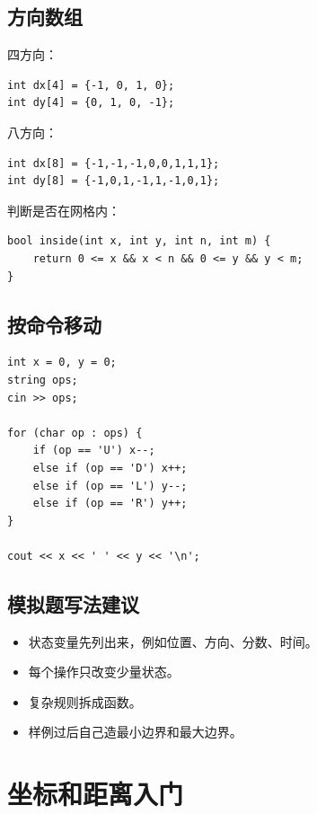 \subsection{方向数组}

四方向：

\begin{lstlisting}
int dx[4] = {-1, 0, 1, 0};
int dy[4] = {0, 1, 0, -1};
\end{lstlisting}

八方向：

\begin{lstlisting}
int dx[8] = {-1,-1,-1,0,0,1,1,1};
int dy[8] = {-1,0,1,-1,1,-1,0,1};
\end{lstlisting}

判断是否在网格内：

\begin{lstlisting}
bool inside(int x, int y, int n, int m) {
    return 0 <= x && x < n && 0 <= y && y < m;
}
\end{lstlisting}

\subsection{按命令移动}

\begin{lstlisting}
int x = 0, y = 0;
string ops;
cin >> ops;

for (char op : ops) {
    if (op == 'U') x--;
    else if (op == 'D') x++;
    else if (op == 'L') y--;
    else if (op == 'R') y++;
}

cout << x << ' ' << y << '\n';
\end{lstlisting}

\subsection{模拟题写法建议}

\begin{itemize}
  \item 状态变量先列出来，例如位置、方向、分数、时间。
  \item 每个操作只改变少量状态。
  \item 复杂规则拆成函数。
  \item 样例过后自己造最小边界和最大边界。
\end{itemize}

\section{坐标和距离入门}\label{sec:05-16}


